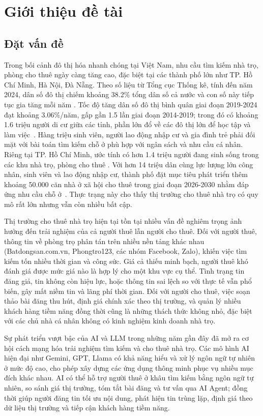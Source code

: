 \chapter{Giới thiệu đề tài}
\label{Chapter1}

\section{Đặt vấn đề}

Trong bối cảnh đô thị hóa nhanh chóng tại Việt Nam, nhu cầu tìm kiếm nhà trọ, phòng cho thuê ngày càng tăng cao, đặc biệt tại các thành phố lớn như TP. Hồ Chí Minh, Hà Nội, Đà Nẵng. Theo số liệu từ Tổng cục Thống kê, tính đến năm 2024, dân số đô thị chiếm khoảng 38.2\% tổng dân số cả nước và con số này tiếp tục gia tăng mỗi năm \cite{TongCucThongKe}. Tốc độ tăng dân số đô thị bình quân giai đoạn 2019-2024 đạt khoảng 3.06\%/năm, gấp gần 1.5 lần giai đoạn 2014-2019; trong đó có khoảng 1.6 triệu người di cư giữa các tỉnh, phần lớn đổ về các đô thị lớn để học tập và làm việc~\cite{TongCucThongKe}. Hàng triệu sinh viên, người lao động nhập cư và gia đình trẻ phải đối mặt với bài toán tìm kiếm chỗ ở phù hợp với ngân sách và nhu cầu cá nhân. Riêng tại TP. Hồ Chí Minh, ước tính có hơn 1.4 triệu người đang sinh sống trong các khu nhà trọ, phòng cho thuê \cite{BanMai}. Với hơn 14 triệu dân cùng lực lượng lớn công nhân, sinh viên và lao động nhập cư, thành phố đặt mục tiêu phát triển thêm khoảng 50.000 căn nhà ở xã hội cho thuê trong giai đoạn 2026-2030 nhằm đáp ứng nhu cầu chỗ ở~\cite{HCMCNhaOThue}. Thực trạng này cho thấy thị trường cho thuê nhà trọ có quy mô rất lớn nhưng vẫn còn nhiều bất cập.

Thị trường cho thuê nhà trọ hiện tại tồn tại nhiều vấn đề nghiêm trọng ảnh hưởng đến trải nghiệm của cả người thuê lẫn người cho thuê. Đối với người thuê, thông tin về phòng trọ phân tán trên nhiều nền tảng khác nhau (Batdongsan.com.vn, Phongtro123, các nhóm Facebook, Zalo), khiến việc tìm kiếm tốn nhiều thời gian và công sức. Giá cả thiếu minh bạch, người thuê khó đánh giá được mức giá nào là hợp lý cho một khu vực cụ thể. Tình trạng tin đăng giả, tin không còn hiệu lực, hoặc thông tin sai lệch so với thực tế vẫn phổ biến, gây mất niềm tin và lãng phí thời gian. Đối với người cho thuê, việc soạn thảo bài đăng thu hút, định giá chính xác theo thị trường, và quản lý nhiều khách hàng tiềm năng đồng thời cũng là những thách thức không nhỏ, đặc biệt với các chủ nhà cá nhân không có kinh nghiệm kinh doanh nhà trọ.

Sự phát triển vượt bậc của AI và LLM trong những năm gần đây đã mở ra cơ hội cách mạng hóa trải nghiệm tìm kiếm và cho thuê nhà trọ. Các mô hình AI hiện đại như Gemini, GPT, Llama có khả năng hiểu và xử lý ngôn ngữ tự nhiên ở mức độ cao, cho phép xây dựng các ứng dụng thông minh phục vụ nhiều mục đích khác nhau. AI có thể hỗ trợ người thuê ở khâu tìm kiếm bằng ngôn ngữ tự nhiên, so sánh giá thị trường, tóm tắt bài đăng và tư vấn qua AI Agent; đồng thời giúp người đăng tin tối ưu nội dung, phát hiện tin trùng lặp, định giá theo dữ liệu thị trường và tiếp cận khách hàng tiềm năng.

